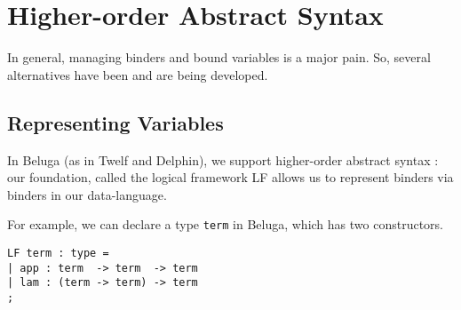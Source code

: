 




\section{Higher-order Abstract Syntax}\label{sec:HOAS}
In general, managing binders and bound variables is a major pain. So,
several alternatives have been and are being developed.

\subsection{Representing Variables}\label{sec:HOAS-var}
In Beluga (as in Twelf and Delphin), we support higher-order abstract
syntax : our foundation, called the logical framework LF
\cite{Harper93jacm} allows us to represent binders via binders in our
data-language.

For example, we can declare a type \lstinline!term! in Beluga,
which has two constructors.

\begin{lstlisting}
LF term : type =
| app : term  -> term  -> term
| lam : (term -> term) -> term
;
\end{lstlisting}

